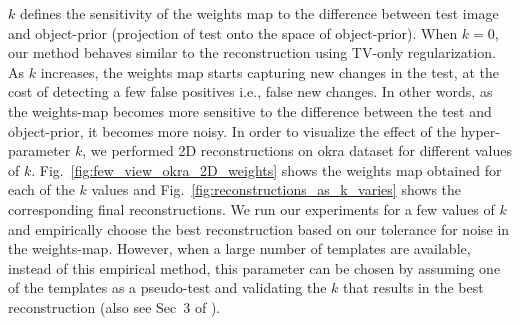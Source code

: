\documentclass[journal]{IEEEtran}
\begin{document}
$k$ defines the sensitivity of the weights map to
the difference between test image and object-prior (projection of test
onto the space of object-prior). When $k=0$, our method behaves
similar to the reconstruction using TV-only regularization. As $k$
increases, the weights map starts capturing new changes in the test,
at the cost of detecting a few false positives i.e., false new
changes. In other words, as the weights-map becomes more sensitive to
the difference between the test and object-prior, it becomes more
noisy. In order to visualize the effect of the hyper-parameter $k$, we
performed 2D reconstructions on okra dataset for different values of
$k$. Fig.~\ref{fig:few_view_okra_2D_weights} shows the weights map
obtained for each of the $k$ values and
Fig.~\ref{fig:reconstructions_as_k_varies} shows the corresponding
final reconstructions. We run our experiments for a few values of $k$
and empirically choose the best reconstruction based on our tolerance
for noise in the weights-map.  However, when a large number of
templates are available, instead of this empirical method, this
parameter can be chosen by assuming one of the templates as a
pseudo-test and validating the $k$ that results in the best
reconstruction (also see Sec~3 of \cite{supp_paper}).
\end{document}
